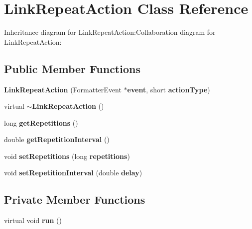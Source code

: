 \section{LinkRepeatAction Class Reference}
\label{classbr_1_1pucrio_1_1telemidia_1_1ginga_1_1ncl_1_1model_1_1link_1_1LinkRepeatAction}
Inheritance diagram for LinkRepeatAction:Collaboration diagram for LinkRepeatAction:\subsection*{Public Member Functions}
\begin{CompactItemize}
\item 
\textbf{LinkRepeatAction} (FormatterEvent $\ast${\bf event}, short {\bf actionType})\label{classbr_1_1pucrio_1_1telemidia_1_1ginga_1_1ncl_1_1model_1_1link_1_1LinkRepeatAction_4034a6313c13deca9d3bd4b83a667c1d}

\item 
virtual {\bf $\sim$LinkRepeatAction} ()\label{classbr_1_1pucrio_1_1telemidia_1_1ginga_1_1ncl_1_1model_1_1link_1_1LinkRepeatAction_ebd8d94a126c6bd428773a7799608e4e}

\item 
long \textbf{getRepetitions} ()\label{classbr_1_1pucrio_1_1telemidia_1_1ginga_1_1ncl_1_1model_1_1link_1_1LinkRepeatAction_df811128997837cc0d2e9a9b18c14d90}

\item 
double \textbf{getRepetitionInterval} ()\label{classbr_1_1pucrio_1_1telemidia_1_1ginga_1_1ncl_1_1model_1_1link_1_1LinkRepeatAction_886d1187d9e9da97ca85c6f451c3f644}

\item 
void \textbf{setRepetitions} (long {\bf repetitions})\label{classbr_1_1pucrio_1_1telemidia_1_1ginga_1_1ncl_1_1model_1_1link_1_1LinkRepeatAction_2f19998ba4642ac9adf64d717b95f1ce}

\item 
void \textbf{setRepetitionInterval} (double {\bf delay})\label{classbr_1_1pucrio_1_1telemidia_1_1ginga_1_1ncl_1_1model_1_1link_1_1LinkRepeatAction_4415050c761827221c29763adf714dce}

\end{CompactItemize}
\subsection*{Private Member Functions}
\begin{CompactItemize}
\item 
virtual void \textbf{run} ()\label{classbr_1_1pucrio_1_1telemidia_1_1ginga_1_1ncl_1_1model_1_1link_1_1LinkRepeatAction_72fcb26a14f6beb1c3fbace9ab3e7dbb}

\end{CompactItemize}

